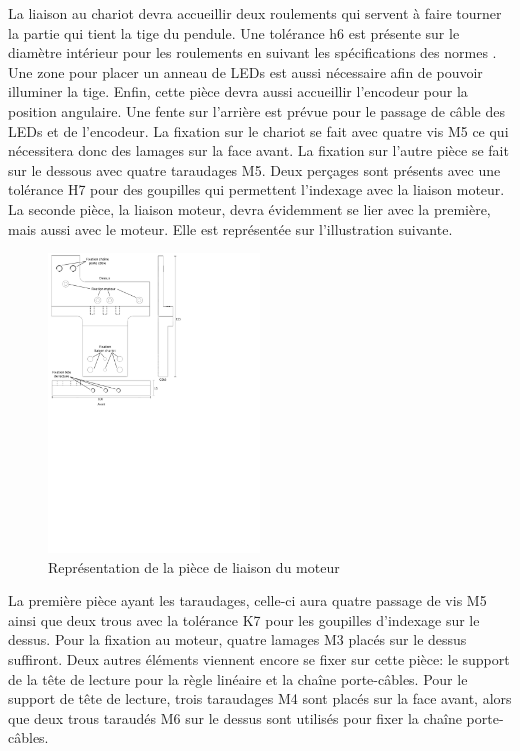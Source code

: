 La liaison au chariot devra accueillir deux roulements qui servent à faire tourner la partie qui tient la tige du pendule. Une tolérance
h6 est présente sur le diamètre intérieur pour les roulements en suivant les spécifications des normes \cite{Ajustements}. Une zone pour placer
un anneau de LEDs est aussi nécessaire afin de pouvoir illuminer la tige. Enfin, cette pièce devra aussi accueillir l'encodeur pour la position
angulaire. Une fente sur l'arrière est prévue pour le passage de câble des LEDs et de l'encodeur. La fixation sur le chariot se fait avec quatre
vis M5 ce qui nécessitera donc des lamages sur la face avant. La fixation sur l'autre pièce se fait sur le dessous avec quatre taraudages M5.
Deux perçages sont présents avec une tolérance H7 pour des goupilles qui permettent l'indexage avec la liaison moteur.\\

La seconde pièce, la liaison moteur, devra évidemment se lier avec la première, mais aussi avec le moteur. Elle est représentée sur l'illustration
suivante.

\begin{figure}[H]
    \centering
    \includegraphics[width = 0.5\textwidth]{assets/figures/LiaisonMoteur.svg}
    \caption{Représentation de la pièce de liaison du moteur}
    \label{fig:LiaisonMoteur}
\end{figure}

La première pièce ayant les taraudages, celle-ci aura quatre passage de vis M5 ainsi que deux trous avec la tolérance K7 pour les goupilles d'indexage
sur le dessus.
Pour la fixation au moteur, quatre lamages M3 placés sur le dessus suffiront. Deux autres éléments viennent encore se fixer sur cette pièce: le support de la tête de
lecture pour la règle linéaire et la chaîne porte-câbles. Pour le support de tête de lecture, trois taraudages M4 sont placés sur la face avant, alors
que deux trous taraudés M6 sur le dessus sont utilisés pour fixer la chaîne porte-câbles.

